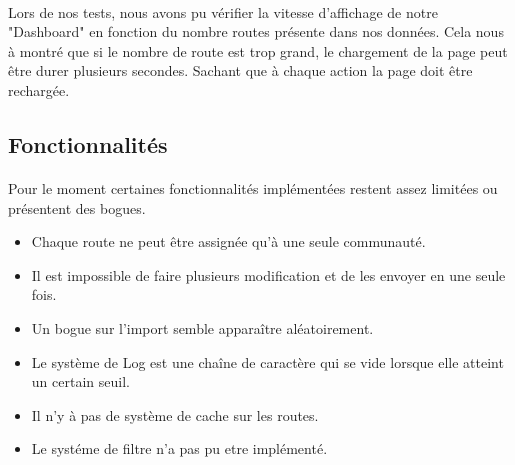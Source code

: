 \paragraph{}Lors de nos tests, nous avons pu vérifier la vitesse d'affichage de notre "Dashboard" en fonction du nombre routes présente dans nos données. Cela nous à montré que si le nombre de route est trop grand, le chargement de la page peut être durer plusieurs secondes. Sachant que à chaque action la page doit être rechargée.



\subsection{Fonctionnalités}
\paragraph{}Pour le moment certaines fonctionnalités implémentées restent assez limitées ou présentent des bogues.
\begin{itemize}
    \item Chaque route ne peut être assignée qu'à une seule communauté.
    \item Il est impossible de faire plusieurs modification et de les envoyer en une seule fois.
    \item Un bogue sur l'import semble apparaître aléatoirement.%
    \item Le système de Log est une chaîne de caractère qui se vide lorsque elle atteint un certain seuil.
    \item Il n'y à pas de système de cache sur les routes.
    \item Le systéme de filtre n'a pas pu etre implémenté.
\end{itemize}


